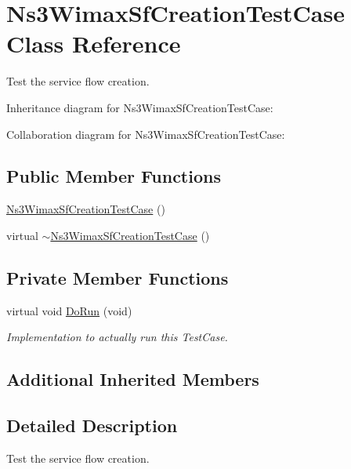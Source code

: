 \hypertarget{classNs3WimaxSfCreationTestCase}{}\section{Ns3\+Wimax\+Sf\+Creation\+Test\+Case Class Reference}
\label{classNs3WimaxSfCreationTestCase}


Test the service flow creation.  




Inheritance diagram for Ns3\+Wimax\+Sf\+Creation\+Test\+Case\+:


Collaboration diagram for Ns3\+Wimax\+Sf\+Creation\+Test\+Case\+:
\subsection*{Public Member Functions}
\begin{DoxyCompactItemize}
\item 
\hyperlink{classNs3WimaxSfCreationTestCase_ad8b823b6585f4ce5600faf5dbc89aa6c}{Ns3\+Wimax\+Sf\+Creation\+Test\+Case} ()
\item 
virtual \hyperlink{classNs3WimaxSfCreationTestCase_af9be1c9c9d27e9d345a50955bc715c76}{$\sim$\+Ns3\+Wimax\+Sf\+Creation\+Test\+Case} ()
\end{DoxyCompactItemize}
\subsection*{Private Member Functions}
\begin{DoxyCompactItemize}
\item 
virtual void \hyperlink{classNs3WimaxSfCreationTestCase_a423b3bbb2ddf0149546bd74c5d8ffc42}{Do\+Run} (void)
\begin{DoxyCompactList}\small\item\em Implementation to actually run this Test\+Case. \end{DoxyCompactList}\end{DoxyCompactItemize}
\subsection*{Additional Inherited Members}


\subsection{Detailed Description}
Test the service flow creation. 

